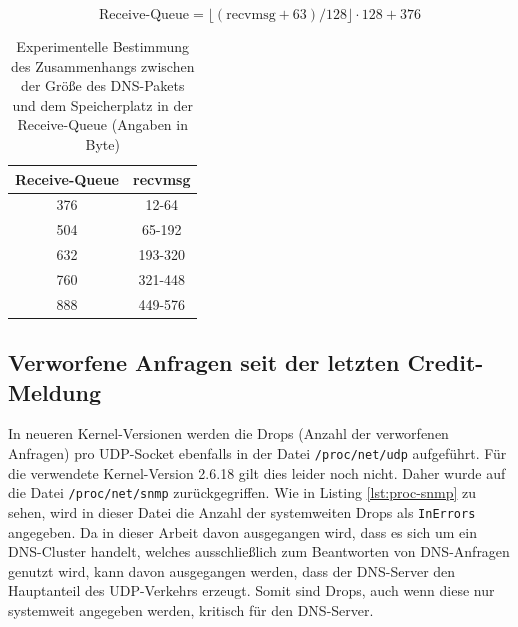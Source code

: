 \documentclass[a4paper, 12pt, BCOR10mm, DIV12, toc=bibliography, toc=listof, german]{scrbook}
\begin{document}
		\begin{equation}
			\text{Receive-Queue} = \lfloor (\text{recvmsg} + 63) / 128 \rfloor \cdot 128 + 376	
			\label{eq:recvmsg}
		\end{equation}

		\begin{table}
			\centering
			\begin{tabular}{|c|c|}\hline
				Receive-Queue & recvmsg \\\hline\hline
				376 & 12-64	\\
				504 & 65-192	\\
				632 & 193-320	\\
				760 & 321-448 \\
				888 &	449-576\\\hline
			\end{tabular}
			\caption{Experimentelle Bestimmung des Zusammenhangs zwischen der Größe des DNS-Pakets und dem
			Speicherplatz in der Receive-Queue (Angaben in Byte)}
			\label{tab:recvmsg}
		\end{table}

		


		\subsection*{Verworfene Anfragen seit der letzten Credit-Meldung} %

		In neueren Kernel-Versionen werden die Drops (Anzahl der verworfenen Anfragen) pro UDP-Socket
		ebenfalls in der Datei \texttt{/proc/net/udp} aufgeführt. Für die verwendete Kernel-Version
		2.6.18 gilt dies leider noch nicht. Daher wurde auf die Datei \texttt{/proc/net/snmp}
		zurückgegriffen. Wie in Listing \ref{lst:proc-snmp} zu sehen, wird in dieser Datei die Anzahl
		der systemweiten Drops als \texttt{InErrors} angegeben. Da in dieser Arbeit davon ausgegangen
		wird, dass es sich um ein DNS-Cluster handelt, welches ausschließlich zum Beantworten von
		DNS-Anfragen genutzt wird, kann davon	ausgegangen werden, dass der DNS-Server den Hauptanteil
		des UDP-Verkehrs erzeugt. Somit sind Drops, auch wenn diese nur systemweit angegeben werden,
		kritisch für den DNS-Server.
		
		
\end{document}
